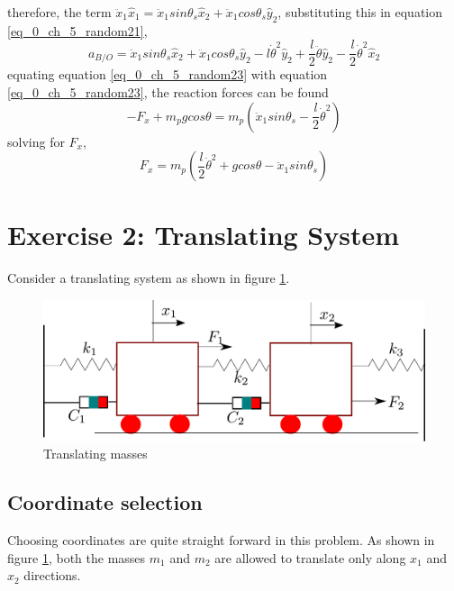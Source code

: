 therefore, the term $\ddot{x}_{1}\hat{x}_{1} = \ddot{x}_{1} sin\theta_{s} \hat{x}_{2} + \ddot{x}_{1} cos\theta_{s} \hat{y}_{2} $, substituting this in equation \eqref{eq_0_ch_5_random21},
\begin{equation}\label{eq_0_ch_5_random23}
	a_{B/O} = \ddot{x}_{1} sin\theta_{s} \hat{x}_{2} + \ddot{x}_{1} cos\theta_{s} \hat{y}_{2} - l \dot{\theta}^{2} \hat{y}_{2} + \frac{l}{2}\ddot{\theta}\hat{y}_{2} - \frac{l}{2}\dot{\theta}^{2} \hat{x}_{2}
\end{equation}
equating equation \eqref{eq_0_ch_5_random23} with equation \eqref{eq_0_ch_5_random23}, the reaction forces can be found
\begin{equation*}
	-F_{x} + m_{p} g cos\theta = m_{p} \left(\ddot{x}_{1} sin\theta_{s}- \frac{l}{2}\dot{\theta}^{2}\right)
\end{equation*}
solving for $F_{x}$,
\begin{equation}
F_{x} = m_{p} \left(\frac{l}{2}\dot{\theta}^{2} + g cos\theta - \ddot{x}_{1} sin\theta_{s} \right)
\end{equation}


\section{Exercise 2: Translating System}

Consider a translating system as shown in figure \ref{fig_0_ch_5_translatingMasses1}. 
\begin{figure}[h!]
	\centering
	\includegraphics[width=0.5\linewidth]{Bilder/29_translatingMasses.pdf}
	\caption{Translating masses}
	\label{fig_0_ch_5_translatingMasses1}
\end{figure}

\subsection{Coordinate selection}
Choosing coordinates are quite straight forward in this problem. As shown in figure \ref{fig_0_ch_5_translatingMasses1}, both the masses $m_1$ and $m_2$ are allowed to translate only along $x_1$ and $x_2$ directions.

